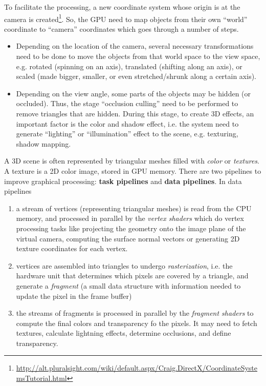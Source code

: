 To facilitate the processing, a new coordinate system whose origin is
at the camera is
created\footnote{\url{http://alt.pluralsight.com/wiki/default.aspx/Craig.DirectX/CoordinateSystemsTutorial.html}}.
So, the GPU need to map objects from their own ``world'' coordinate to
``camera'' coordinates which goes through a number of steps.
\begin{itemize}
\item Depending on the location of the camera, several necessary
  transformations need to be done to move the objects from that world
  space to the view space, e.g.  rotated (spinning on an axis),
  translated (shifting along an axis), or scaled (made bigger,
  smaller, or even stretched/shrunk along a certain axis).

\item Depending on the view angle, some parts of the objects may be
  hidden (or occluded). Thus, the stage ``occlusion culling'' need to
  be performed to remove triangles that are hidden. During this stage,
  to create 3D effects, an important factor is the color and shadow
  effect, i.e. the system need to generate ``lighting'' or
  ``illumination'' effect to the scene, e.g. texturing, shadow mapping.
\end{itemize}

A 3D scene is often represented by triangular meshes filled with {\it color} or
{\it textures}. A texture is a 2D color image, stored in GPU memory. There are
two pipelines to improve graphical processing: {\bf task pipelines} and {\bf
data pipelines}. In data pipelines
\begin{enumerate}
  \item a stream of vertices (representing triangular meshes) is read from the
  CPU memory, and processed in parallel by the {\it vertex shaders} which do
  vertex processing tasks like projecting the geometry onto the image plane of
  the virtual camera, computing the surface normal vectors or generating 2D
  texture coordinates for each vertex.
  \item vertices are assembled into triangles to undergo {\it rasterization},
  i.e. the hardware unit that determines which pixels are covered by a triangle,
  and generate a {\it fragment} (a small data structure with information needed
  to update the pixel in the frame buffer)
  \item the streams of fragments is processed in parallel by the {\it fragment
  shaders} to compute the final colors and transparency fo the pixels. It may
  need to fetch textures, calculate lightning effects, determine occlusions,
  and define transparency.
\end{enumerate}

